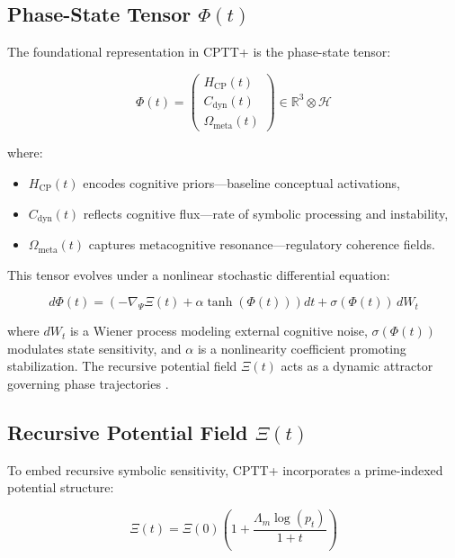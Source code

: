 \documentclass[12pt]{article}
\begin{document}
\subsection{Phase-State Tensor $\Phi(t)$}

The foundational representation in CPTT+ is the phase-state tensor:

\begin{equation}
\Phi(t) = \begin{pmatrix} H_{\text{CP}}(t) \\ C_{\text{dyn}}(t) \\ \Omega_{\text{meta}}(t) \end{pmatrix} \in \mathbb{R}^3 \otimes \mathcal{H}
\end{equation}

\noindent where:
\begin{itemize}
  \item $H_{\text{CP}}(t)$ encodes cognitive priors—baseline conceptual activations,
  \item $C_{\text{dyn}}(t)$ reflects cognitive flux—rate of symbolic processing and instability,
  \item $\Omega_{\text{meta}}(t)$ captures metacognitive resonance—regulatory coherence fields.
\end{itemize}

\noindent This tensor evolves under a nonlinear stochastic differential equation:

\begin{equation}
d\Phi(t) = \left( -\nabla_{\Psi} \Xi(t) + \alpha \tanh(\Phi(t)) \right) dt + \sigma(\Phi(t)) \, dW_t
\end{equation}

\noindent where $dW_t$ is a Wiener process modeling external cognitive noise, $\sigma(\Phi(t))$ modulates state sensitivity, and $\alpha$ is a nonlinearity coefficient promoting stabilization. The recursive potential field $\Xi(t)$ acts as a dynamic attractor governing phase trajectories \cite{strogatz2018nonlinear, gardiner2009stochastic}.

\subsection{Recursive Potential Field $\Xi(t)$}

To embed recursive symbolic sensitivity, CPTT+ incorporates a prime-indexed potential structure:

\begin{equation}
\Xi(t) = \Xi(0) \left(1 + \frac{\Lambda_m \log(p_t)}{1 + t} \right)
\end{equation}
\end{document}
